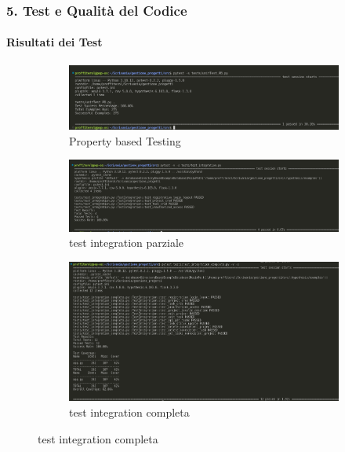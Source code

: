 \documentclass{beamer}
\begin{document}
\begin{frame}
\frametitle{5. Test e Qualità del Codice}
\framesubtitle{Risultati dei Test}
\begin{figure}[h!]
    \centering
    \begin{subfigure}[b]{0.45\textwidth}
        \centering
        \includegraphics[width=\textwidth]{test_PB.png}
        \caption{Property based Testing}

    \end{subfigure}
    \hfill
    \begin{subfigure}[b]{0.45\textwidth}
        \centering
        \includegraphics[width=\textwidth]{test_integration.png}
        \caption{test integration parziale}
    \end{subfigure}
      \hfill
    \begin{subfigure}[b]{0.45\textwidth}
        \centering
        \includegraphics[width=\textwidth]{test_integration_completa.png}
        \caption{test integration completa}
    \end{subfigure}
\end{figure}
\end{frame}
\end{document}
